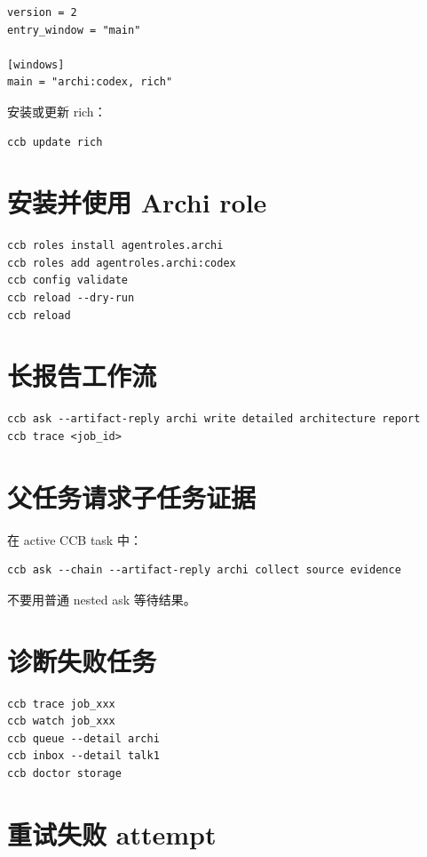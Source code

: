 \begin{lstlisting}
version = 2
entry_window = "main"

[windows]
main = "archi:codex, rich"
\end{lstlisting}

安装或更新 rich：

\begin{lstlisting}
ccb update rich
\end{lstlisting}

\section{安装并使用 Archi role}

\begin{lstlisting}
ccb roles install agentroles.archi
ccb roles add agentroles.archi:codex
ccb config validate
ccb reload --dry-run
ccb reload
\end{lstlisting}

\section{长报告工作流}

\begin{lstlisting}
ccb ask --artifact-reply archi write detailed architecture report
ccb trace <job_id>
\end{lstlisting}

\section{父任务请求子任务证据}

在 active CCB task 中：

\begin{lstlisting}
ccb ask --chain --artifact-reply archi collect source evidence
\end{lstlisting}

不要用普通 nested ask 等待结果。

\section{诊断失败任务}

\begin{lstlisting}
ccb trace job_xxx
ccb watch job_xxx
ccb queue --detail archi
ccb inbox --detail talk1
ccb doctor storage
\end{lstlisting}

\section{重试失败 attempt}


